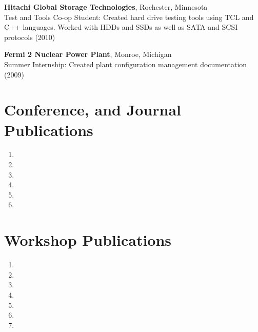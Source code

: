 \documentclass{article}
\begin{document}
{\bf Hitachi Global Storage Technologies}, Rochester, Minnesota \\
Test and Tools Co-op Student: Created hard drive testing tools using TCL and
C++ languages. Worked with HDDs and SSDs as well as SATA and SCSI protocols (2010)

{\bf Fermi 2 Nuclear Power Plant}, Monroe, Michigan \\
Summer Internship: Created plant configuration management documentation (2009)


\section*{Conference, and Journal Publications}
\begin{enumerate}
  \item {}
  \item {}
  \item {}
  \item {}
  \item {}
  \item {}
\end{enumerate}

\section*{Workshop Publications}
\begin{enumerate}
  \item {}
  \item {}
  \item {}
  \item {}
  \item {}
  \item {}
  \item {}
\end{enumerate}
\end{document}
